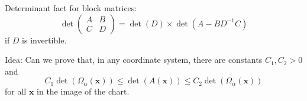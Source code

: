\documentclass{article}
\theoremstyle{definition}
\renewcommand\det{\operatorname{det}}
\newcommand{\al}{\alpha}
\newcommand{\f}[2]{\frac{#1}{#2}}
\theoremstyle{theorem}
\begin{document}
Determinant fact for block matrices:
\begin{equation*}
    \det\begin{pmatrix}
    A & B \\ C & D
    \end{pmatrix}
    = \det(D) \times \det(A - BD^{-1}C)
\end{equation*}
if $D$ is invertible. 


Idea: Can we prove that, in any coordinate system, there are constants $C_1,C_2>0$ and 
\begin{equation*}
C_1\det(\Omega_{\alpha}(\mathbf{x}))\leq \det(A(\mathbf{x}))\leq C_2\det(\Omega_{\alpha}(\mathbf{x}))
\end{equation*}
for all $\mathbf{x}$ in the image of the chart.


\end{document}
